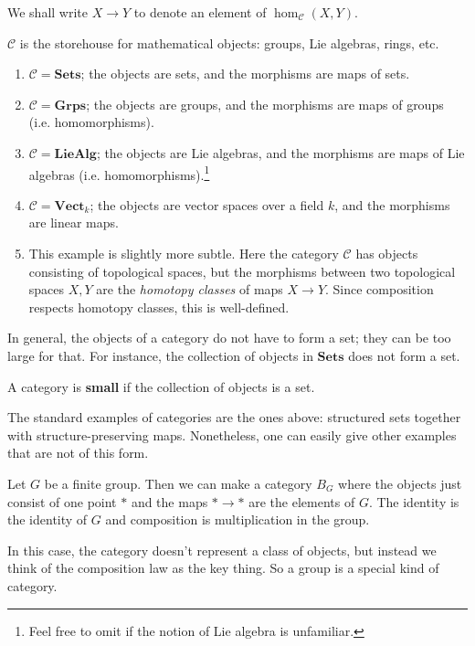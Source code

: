 We shall write $X \to Y$ to denote an element of $\hom_{\mathcal{C}}(X, Y)$.

$\mathcal{C}$ is the storehouse for mathematical objects: groups, Lie algebras,
rings, etc.
\begin{example}
\begin{enumerate}
\item $\mathcal{C}  = \mathbf{Sets}$; the objects are sets, and the morphisms
are maps of sets.
\item $\mathcal{C} = \mathbf{Grps}$; the objects are groups, and the morphisms
are maps of groups (i.e. homomorphisms).
\item $\mathcal{C} = \mathbf{LieAlg}$; the objects are Lie algebras, and the
morphisms are maps of Lie algebras (i.e. homomorphisms).\footnote{Feel free to
omit if the notion of Lie algebra is unfamiliar.}
\item  $\mathcal{C} = \mathbf{Vect}_k$; the objects are vector spaces over a
field $k$, and the morphisms are linear maps.
\item  This example is slightly more subtle. Here the category $\mathcal{C}$
has objects consisting of topological spaces, but the morphisms between two
topological spaces $X,Y$ are the \emph{homotopy classes} of maps $X \to Y$.
Since composition respects homotopy classes, this is well-defined.
\end{enumerate}
\end{example}



In general, the objects of a category do not have to form a set; they can
be too large for
that.
For instance, the collection of objects in $\mathbf{Sets}$ does not form a set.

\begin{definition}
A category is \textbf{small} if the collection of objects is a set.
\end{definition}

The standard examples of categories are the ones above: structured sets
together with structure-preserving maps. Nonetheless, one can easily give
other examples that are not of this form.

\begin{example}
Let $G$ be a finite group. Then we can make a category $B_G$ where the objects
just consist of one point $\ast$ and the maps $\ast \to \ast$ are the elements
of $G$. The identity is the identity of $G$ and composition is multiplication
in the group.

In this case, the category doesn't represent  a class of objects, but
instead we think of the composition law as the key thing. So a group is a
special kind of category.
\end{example}

